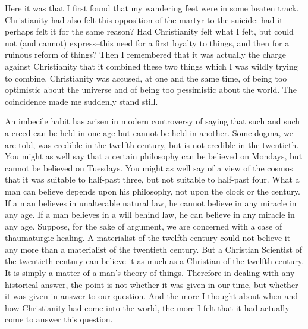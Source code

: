 \documentclass{book}
\begin{document}
Here it was that I first found that my wandering feet were in some beaten track. Christianity had also felt this opposition of the martyr to the suicide: had it perhaps felt it for the same reason? Had Christianity felt what I felt, but could not (and cannot) express–this need for a first loyalty to things, and then for a ruinous reform of things? Then I remembered that it was actually the charge against Christianity that it combined these two things which I was wildly trying to combine. Christianity was accused, at one and the same time, of being too optimistic about the universe and of being too pessimistic about the world. The coincidence made me suddenly stand still.

An imbecile habit has arisen in modern controversy of saying that such and such a creed can be held in one age but cannot be held in another. Some dogma, we are told, was credible in the twelfth century, but is not credible in the twentieth. You might as well say that a certain philosophy can be believed on Mondays, but cannot be believed on Tuesdays. You might as well say of a view of the cosmos that it was suitable to half-past three, but not suitable to half-past four. What a man can believe depends upon his philosophy, not upon the clock or the century. If a man believes in unalterable natural law, he cannot believe in any miracle in any age. If a man believes in a will behind law, he can believe in any miracle in any age. Suppose, for the sake of argument, we are concerned with a case of thaumaturgic healing. A materialist of the twelfth century could not believe it any more than a materialist of the twentieth century. But a Christian Scientist of the twentieth century can believe it as much as a Christian of the twelfth century. It is simply a matter of a man’s theory of things. Therefore in dealing with any historical answer, the point is not whether it was given in our time, but whether it was given in answer to our question. And the more I thought about when and how Christianity had come into the world, the more I felt that it had actually come to answer this question.
\end{document}
